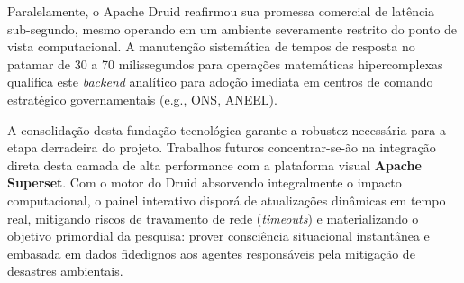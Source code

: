 \documentclass[12pt, a4paper]{article}
\begin{document}
Paralelamente, o Apache Druid reafirmou sua promessa comercial de latência sub-segundo, mesmo operando em um ambiente severamente restrito do ponto de vista computacional. A manutenção sistemática de tempos de resposta no patamar de 30 a 70 milissegundos para operações matemáticas hipercomplexas qualifica este \textit{backend} analítico para adoção imediata em centros de comando estratégico governamentais (e.g., ONS, ANEEL). 

A consolidação desta fundação tecnológica garante a robustez necessária para a etapa derradeira do projeto. Trabalhos futuros concentrar-se-ão na integração direta desta camada de alta performance com a plataforma visual \textbf{Apache Superset}. Com o motor do Druid absorvendo integralmente o impacto computacional, o painel interativo disporá de atualizações dinâmicas em tempo real, mitigando riscos de travamento de rede (\textit{timeouts}) e materializando o objetivo primordial da pesquisa: prover consciência situacional instantânea e embasada em dados fidedignos aos agentes responsáveis pela mitigação de desastres ambientais.
\end{document}
